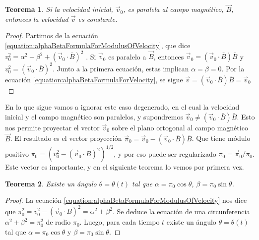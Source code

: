 \documentclass{article}
\newtheorem{theorem}{Teorema}
\begin{document}
  \begin{theorem}
    Si la velocidad inicial, \(\vec{v}_0\), es paralela al campo magnético, \(\vec{B}\), entonces la velocidad \(\vec{v}\) es constante.
  \end{theorem}
  \begin{proof}
    Partimos de la ecuación \eqref{equation:alphaBetaFormulaForModulusOfVelocity}, que dice \(
      v_0^2
      =
      \alpha^2 + \beta^2
      + (\vec{v}_0 \cdot \bar{B})^2
    \)
    .
    Si \(\vec{v}_0\) es paralelo a \(\vec{B}\), entonces \(\vec{v}_0 = (\vec{v}_0 \cdot \bar{B}) \bar{B}\) y \(v_0^2 = (\vec{v}_0 \cdot \bar{B})^2\).
    Junto a la primera ecuación, estas implican \(\alpha = \beta = 0\).
    Por la ecuación \eqref{equation:alphaBetaFormulaForVelocity}, se sigue \(\vec{v} = (\vec{v}_0 \cdot \bar{B}) \bar{B} = \vec{v}_0\)
  \end{proof}

  En lo que sigue vamos a ignorar este caso degenerado, en el cual la velocidad inicial y el campo magnético son paralelos, y supondremos \(\vec{v}_0 \neq (\vec{v}_0 \cdot \bar{B}) \bar{B}\).
  Esto nos permite proyectar el vector \(\vec{v}_0\) sobre el plano ortogonal al campo magnético \(\vec{B}\).
  El resultado es el vector proyección \(\vec{\pi}_0 = \vec{v}_0 - (\vec{v}_0 \cdot \bar{B}) \bar{B}\).
  Que tiene módulo positivo \(\pi_0 = (v_0^2 - (\vec{v}_0 \cdot \bar{B})^2)^{1 / 2}\), y por eso puede ser regularizado \(\bar{\pi}_0 = \vec{\pi}_0 / \pi_0\).
  Este vector es importante, y en el siguiente teorema lo vemos por primera vez.

  \begin{theorem}
    \label{theorem:alphaBetaDescribeCircularMotion}
    Existe un ángulo \(\theta = \theta(t)\) tal que \(\alpha = \pi_0 \cos \theta\), \(\beta = \pi_0 \sin \theta\).
  \end{theorem}
  \begin{proof}
    La ecuación \ref{equation:alphaBetaFormulaForModulusOfVelocity} nos dice que \(\pi_0^2 = v_0^2 - (\vec{v}_0 \cdot \bar{B})^2 = \alpha^2 + \beta^2\).
    Se deduce la ecuación de una circunferencia \(\alpha^2 + \beta^2 = \pi_0^2\) de radio \(\pi_0\).
    Luego, para cada tiempo \(t\) existe un ángulo \(\theta = \theta(t)\) tal que \(\alpha = \pi_0 \cos \theta\) y \(\beta = \pi_0 \sin \theta\).
  \end{proof}
\end{document}
